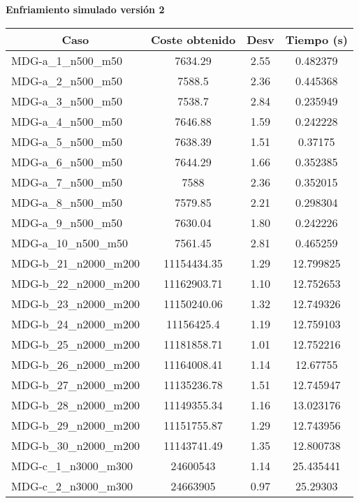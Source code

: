\documentclass[11pt,a4paper]{article}
\begin{document}
\newpage			
\textbf{Enfriamiento simulado versión 2}
\begin{table}[H]
	\begin{center}
		\begin{tabular}{|l|c|c|c|} 
			\hline
			\multicolumn{1}{|c|}{\textbf{Caso}} & \textbf{Coste obtenido} & \textbf{Desv} & \textbf{Tiempo (s)} \\ \hline
		MDG-a\_1\_n500\_m50 & 7634.29 & 2.55 & 0.482379 \\ \hline
		MDG-a\_2\_n500\_m50 & 7588.5 & 2.36 & 0.445368 \\ \hline
		MDG-a\_3\_n500\_m50 & 7538.7 & 2.84 & 0.235949 \\ \hline
		MDG-a\_4\_n500\_m50 & 7646.88 & 1.59 & 0.242228 \\ \hline
		MDG-a\_5\_n500\_m50 & 7638.39 & 1.51 & 0.37175 \\ \hline
		MDG-a\_6\_n500\_m50 & 7644.29 & 1.66 & 0.352385 \\ \hline
		MDG-a\_7\_n500\_m50 & 7588 & 2.36 & 0.352015 \\ \hline
		MDG-a\_8\_n500\_m50 & 7579.85 & 2.21 & 0.298304 \\ \hline
		MDG-a\_9\_n500\_m50 & 7630.04 & 1.80 & 0.242226 \\ \hline
		MDG-a\_10\_n500\_m50 & 7561.45 & 2.81 & 0.465259 \\ \hline
		MDG-b\_21\_n2000\_m200 & 11154434.35 & 1.29 & 12.799825 \\ \hline
		MDG-b\_22\_n2000\_m200 & 11162903.71 & 1.10 & 12.752653 \\ \hline
		MDG-b\_23\_n2000\_m200 & 11150240.06 & 1.32 & 12.749326 \\ \hline
		MDG-b\_24\_n2000\_m200 & 11156425.4 & 1.19 & 12.759103 \\ \hline
		MDG-b\_25\_n2000\_m200 & 11181858.71 & 1.01 & 12.752216 \\ \hline
		MDG-b\_26\_n2000\_m200 & 11164008.41 & 1.14 & 12.67755 \\ \hline
		MDG-b\_27\_n2000\_m200 & 11135236.78 & 1.51 & 12.745947 \\ \hline
		MDG-b\_28\_n2000\_m200 & 11149355.34 & 1.16 & 13.023176 \\ \hline
		MDG-b\_29\_n2000\_m200 & 11151755.87 & 1.29 & 12.743956 \\ \hline
		MDG-b\_30\_n2000\_m200 & 11143741.49 & 1.35 & 12.800738 \\ \hline
		MDG-c\_1\_n3000\_m300 & 24600543 & 1.14 & 25.435441 \\ \hline
		MDG-c\_2\_n3000\_m300 & 24663905 & 0.97 & 25.29303 \\ \hline

\end{tabular}
\end{center}
\end{table}
\end{document}
